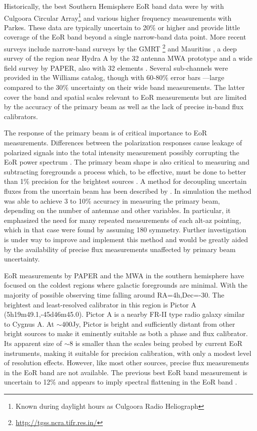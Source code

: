\documentclass[preprint]{aastex}
\begin{document}
Historically, the best Southern Hemisphere 
EoR band data were by \citet{Slee:1995p7541} with Culgoora Circular
Array\footnote{Known during daylight hours as Culgoora Radio Heliograph} and
various higher frequency measurements with Parkes.  These data are typically
uncertain to 20\% or higher and provide little coverage of the EoR band beyond
a single narrow-band data point. 
More recent surveys include narrow-band surveys by the GMRT \footnote{\url{http://tgss.ncra.tifr.res.in/}} and Mauritius \citep{Pandey:2005p8687}, a
deep survey of the region near Hydra A by the 32 antenna MWA prototype
\cite{Williams:2012p8768} and a wide field survey by PAPER, also with 32
elements \cite{Jacobs:2011p8438}. Several sub-channels were provided in the
Williams catalog, though with 60-80\% error bars ---large compared to the 30\%
uncertainty on their wide band measurements.  The latter cover the band and
spatial scales relevant to EoR measurements but are limited by the accuracy of
the primary beam \citep{Jacobs:2013p9908} as well as the lack of precise in-band flux calibrators.

The response of the primary beam is of critical importance to EoR measurements.
Differences between the polarization responses cause leakage of polarized
signals into the total intensity measurement possibly corrupting the 
EoR power spectrum \citep{Moore:2013p9941}.  The primary beam 
shape is also critical to measuring and subtracting foregrounds 
\cite{Bernardi:2013p9859,Sullivan:2012p9457,Morales:2012p8790} a process which, to be effective, must be done to better than 1\%
precision for the brightest sources \citet{Liu:2009p4762,Bowman:2009p7816} .
A method for decoupling uncertain fluxes from the uncertain beam has been
described by \citet{Pober:2012p8800}. In simulation the method was able to
achieve 3 to 10\% accuracy in measuring the primary beam, depending on the
number of antennae and other variables. In particular, it emphasized the need
for many repeated measurements of each alt-az pointing, which in that
case were found by assuming 180\arcdeg{} symmetry. Further investigation
is under way to improve and implement this method and would be greatly aided by
the availability of precise flux measurements unaffected by primary beam
uncertainty. 

EoR measurements by PAPER and the MWA in the southern hemisphere have focused on the coldest regions where
galactic foregrounds are minimal. With the majority of possible observing time falling around
RA=4h,Dec=-30. The brightest and least-resolved calibrator in this region is Pictor A 
(5h19m49.1,-45d46m45.0). Pictor A is a nearby FR-II type radio galaxy 
 similar to Cygnus A.  At $\sim$400Jy, Pictor is bright and sufficiently distant from other 
bright sources to make it eminently suitable as both a phase and flux calibrator. Its apparent
size of $\sim$8\arcmin{} is smaller than the scales being probed by current EoR instruments, 
making it suitable for precision calibration, with only a modest
level of resolution effects.
However, 
like most other sources, precise flux measurements in the EoR band are not available.
The previous best EoR band measurement
is uncertain to 12\% and appears to imply spectral flattening in the EoR band
\citep{Perley:1997p9312}. 
 
\end{document}
